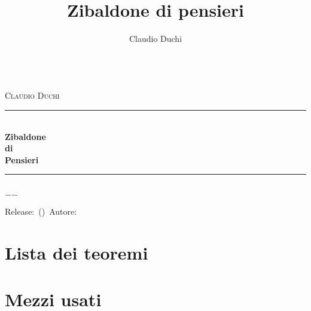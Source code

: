 \documentclass[a4paper,oneside,12pt]{book}%
\title{Zibaldone di pensieri}
\author{Claudio Duchi}
\date{\datetime}
\makeatletter
\theoremstyle{marginbreak}
\theoremstyle{marginbreak}
\theoremstyle{changebreak}
\theoremstyle{change}
\theoremstyle{change}
\theoremstyle{plain}
\theoremstyle{marginbreak}
\theoremstyle{plain}
\theoremstyle{plain}
\theoremstyle{nonumberplain}
\theoremstyle{marginbreak}
\newcommand{\HRule}{\rule{\linewidth}{0.5mm}}
\renewcommand\mainmatter{%
 	\cleardoublepage
 	\@mainmattertrue
 }
\makeatother
\begin{document}
\begin{titlepage}
\begin{center}	
	\Lgrandedue\\[1cm]    
	\textsc{\LARGE Claudio Duchi}\\[1.4cm]
	\HRule \\[0.4cm]
{ \huge \bfseries Zibaldone}\\[0.4cm]
{ \large \bfseries di}\\[0.4cm]
{ \huge \bfseries Pensieri}\\[0.4cm]
\HRule \\
\vfill
		{\large $-$\DTMnow$-$}	
\end{center}
{\centering
Release:\gitReln\ (\gitAbbrevHash)\ Autore:\gitAuthorName\ 
\gitCommitterDate \\
}
\end{titlepage}	
	\hypersetup{pageanchor=true}
		\CDcopyright
		\tableofcontents
		\chapter*{Lista dei teoremi}
		\listoffigures
			\mainmatter
			

\nocite{*}
\printbibliography
 \printindex
 \appendix
 \chapter{Mezzi usati}
 \CDMezziUsati
\end{document}
